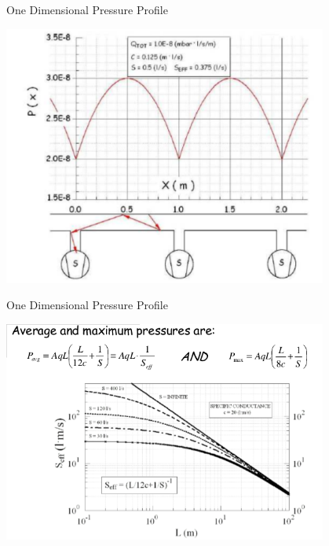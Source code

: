 \documentclass[11]{beamer}
\begin{document}
\begin{frame}{One Dimensional Pressure Profile}
		
	
	\begin{center}
		\includegraphics[width=0.8\textwidth]{SpatialPrProfile.png}	
		
	\end{center}
	
	
	
	

\end{frame}


\begin{frame}{One Dimensional Pressure Profile}
		
	
	\begin{center}
		
		\includegraphics[width=0.8\textwidth]{SpatialPrProfileAvgPr.png}	
	\end{center}
	
	
	
	

\end{frame}
\end{document}

